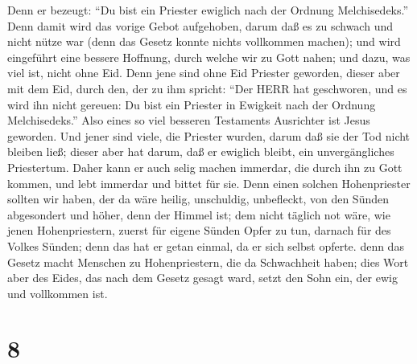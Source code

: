  Denn er bezeugt: ``Du bist ein Priester ewiglich nach der
Ordnung Melchisedeks.''  Denn damit wird das vorige Gebot
aufgehoben, darum daß es zu schwach und nicht nütze war 
(denn das Gesetz konnte nichts vollkommen machen); und wird eingeführt
eine bessere Hoffnung, durch welche wir zu Gott nahen;  und
dazu, was viel ist, nicht ohne Eid. Denn jene sind ohne Eid Priester
geworden,  dieser aber mit dem Eid, durch den, der zu ihm
spricht: ``Der HERR hat geschworen, und es wird ihn nicht gereuen: Du
bist ein Priester in Ewigkeit nach der Ordnung Melchisedeks.''
 Also eines so viel besseren Testaments Ausrichter ist
Jesus geworden.  Und jener sind viele, die Priester wurden,
darum daß sie der Tod nicht bleiben ließ;  dieser aber hat
darum, daß er ewiglich bleibt, ein unvergängliches Priestertum.
 Daher kann er auch selig machen immerdar, die durch ihn zu
Gott kommen, und lebt immerdar und bittet für sie.  Denn
einen solchen Hohenpriester sollten wir haben, der da wäre heilig,
unschuldig, unbefleckt, von den Sünden abgesondert und höher, denn der
Himmel ist;  dem nicht täglich not wäre, wie jenen
Hohenpriestern, zuerst für eigene Sünden Opfer zu tun, darnach für des
Volkes Sünden; denn das hat er getan einmal, da er sich selbst opferte.
 denn das Gesetz macht Menschen zu Hohenpriestern, die da
Schwachheit haben; dies Wort aber des Eides, das nach dem Gesetz gesagt
ward, setzt den Sohn ein, der ewig und vollkommen ist.

\hypertarget{section-7}{%
\section{8}\label{section-7}}

